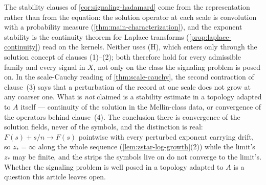 \begin{remark}\label{rem:signaling-stability}
The stability clauses of \ref{cor:signaling-hadamard} come from the representation rather
than from the equation: the solution operator at each scale is convolution with a
probability measure (\ref{thm:main-characterization}), and the exponent stability is the
continuity theorem for Laplace transforms (\ref{prop:laplace-continuity}) read on the
kernels. Neither uses (H), which enters only through the solution concept of clauses
(1)--(2); both therefore hold for every admissible family and every signal in $X$, not
only on the class the signaling problem is posed on. In the scale-Cauchy reading of
\ref{thm:scale-cauchy}, the second contraction of clause~(3) says that a perturbation of
the record at one scale does not grow at any coarser one. What is \emph{not} claimed is a
stability estimate in a topology adapted to $A$ itself --- continuity of the solution in
the Mellin-class data, or convergence of the operators behind clause~(4). The conclusion
there is convergence of the solution fields, never of the symbols, and the distinction is
real: $F(s) + s/n \to F(s)$ pointwise with every perturbed exponent carrying drift, so
$z_* = \infty$ along the whole sequence (\ref{lem:zstar-log-growth}(2)) while the limit's
$z_*$ may be finite, and the strips the symbols live on do not converge to the limit's.
Whether the signaling problem is well posed in a topology adapted to $A$ is a question
this article leaves open.
\end{remark}
